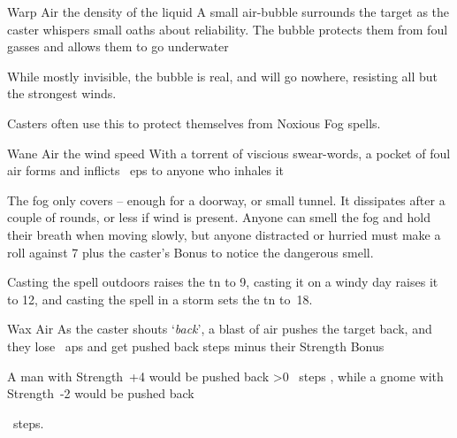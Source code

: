 \ifodd\value{diceNo}

  {}%
  {Warp}%
  {Air}%
  {the density of the liquid}%
  {A small air-bubble surrounds the target as the caster whispers small oaths about reliability.
  The bubble protects them from foul gasses and allows them to go underwater}%
  {While mostly invisible, the bubble is real, and will go nowhere, resisting all but the strongest winds.

    Casters often use this to protect themselves from Noxious Fog spells.}

  {}%
  {Wane}%
  {Air}%
  {the wind speed}%
  {With a torrent of viscious swear-words, a pocket of foul air forms and inflicts ~\glspl{ep} to anyone who inhales it}%
  {
    The fog only covers  -- enough for a doorway, or small tunnel.
    It dissipates after a couple of \glspl{round}, or less if wind is present.
    Anyone can smell the fog and hold their breath when moving slowly, but anyone distracted or hurried must make a  roll against 7 plus the caster's Bonus to notice the dangerous smell.

    Casting the spell outdoors raises the \gls{tn} to 9, casting it on a windy day raises it to 12, and casting the spell in a storm sets the \gls{tn} to~18.
  }

\else

  {}%
  {Wax}%
  {Air}%
  {}%
  {As the caster shouts `\textit{back}', a blast of air pushes the target back, and they lose ~\glspl{ap} and get pushed back  \glspl{step} minus their Strength Bonus}%
  {
  \begin{exampletext}
    \setcounter{track}{3}
    \addtocounter{track}{-\value{spellPlusTwo}}
    A man with Strength~+4 would be pushed back
    \ifnum\value{track}>0%
    ~\glspl{step}%
    \fi,
    while a gnome with Strength~-2 would be pushed back
    \setcounter{track}{-2}
    \addtocounter{track}{-\value{spellPlusTwo}}
    ~\glspl{step}.
  \end{exampletext}
  }

\fi
{}
